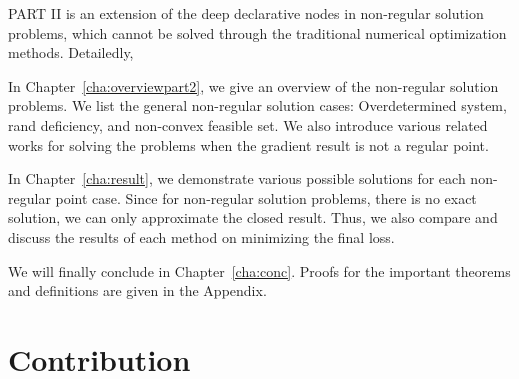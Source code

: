 \par PART II is an extension of the deep declarative nodes in non-regular solution problems, which cannot be solved through the traditional numerical optimization methods. Detailedly, 
\begin{description}
    \item In Chapter~\ref{cha:overviewpart2}, we give an overview of the non-regular solution problems. We list the general non-regular solution cases: Overdetermined system, rand deficiency, and non-convex feasible set. We also introduce various related works for solving the problems when the gradient result is not a regular point. 
    \item In Chapter~\ref{cha:result}, we demonstrate various possible solutions for each non-regular point case. Since for non-regular solution problems, there is no exact solution, we can only approximate the closed result. Thus, we also compare and discuss the results of each method on minimizing the final loss. 
\end{description}
We will finally conclude in Chapter~\ref{cha:conc}. Proofs for the important theorems and definitions are given in the Appendix.

\section{Contribution}
\label{sec.contribution}